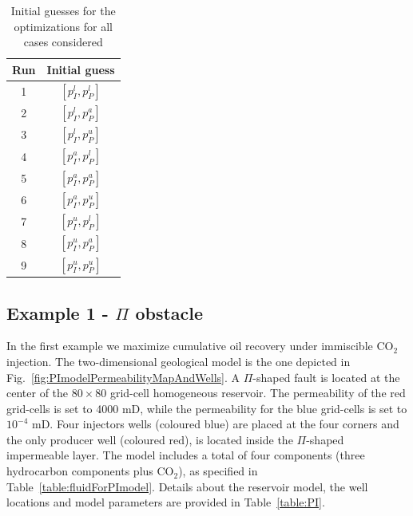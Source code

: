 \documentclass[twocolumn,numbook]{svjour3}          %
\begin{document}
\begin{table}
\centering
\caption{Initial guesses for the optimizations for all
         cases considered}
\begin{tabular}{|c|c|}
\hline
Run & Initial guess    \\
\hline
1 & $[p_I^l, p_P^l]$ \\
2 & $[p_I^l, p_P^a]$ \\
3 & $[p_I^l, p_P^u]$ \\
4 & $[p_I^a, p_P^l]$ \\
5 & $[p_I^a, p_P^a]$ \\
6 & $[p_I^a, p_P^u]$ \\
7 & $[p_I^u, p_P^l]$ \\
8 & $[p_I^u, p_P^a]$ \\
9 & $[p_I^u, p_P^u]$ \\
\hline
\end{tabular}
  \label{table:InitialGuesses}
\end{table}





\subsection{Example 1 - $\Pi$ obstacle}
In the first example we maximize cumulative oil recovery under immiscible CO$_2$ injection. 
The two-dimensional geological model is the one depicted in Fig.~\ref{fig:PImodelPermeabilityMapAndWells}. 
A $\Pi$-shaped fault is located at the center of the $80\times80$ grid-cell homogeneous 
reservoir. The permeability of the red grid-cells is set to 4000 mD, while the permeability for the 
blue grid-cells is set to $10^{-4}$ mD. Four injectors wells (coloured blue) are placed at the four corners 
 and the only producer well  (coloured red), is located inside the $\Pi$-shaped impermeable 
layer. The model includes a total of four components (three hydrocarbon 
components plus CO$_2$), as specified in Table~\ref{table:fluidForPImodel}. Details 
about the reservoir model, the well locations and model parameters are provided in Table~\ref{table:PI}.
\end{document}

